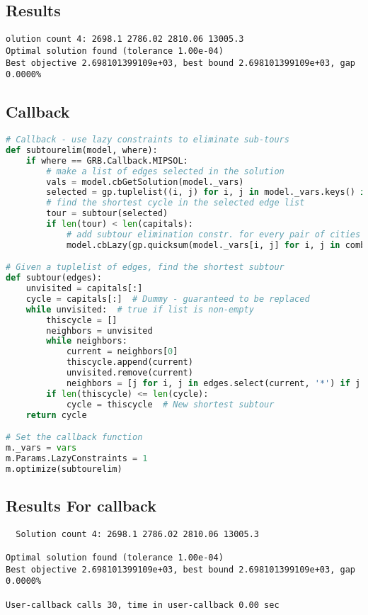 \subsection*{Results}
\begin{verbatim}
olution count 4: 2698.1 2786.02 2810.06 13005.3 
Optimal solution found (tolerance 1.00e-04)
Best objective 2.698101399109e+03, best bound 2.698101399109e+03, gap 0.0000%
\end{verbatim}
\subsection*{Callback}
\begin{center}
    \begin{lstlisting}[language=Python, caption={Using Callback Function}]
        # Callback - use lazy constraints to eliminate sub-tours
def subtourelim(model, where):
    if where == GRB.Callback.MIPSOL:
        # make a list of edges selected in the solution
        vals = model.cbGetSolution(model._vars)
        selected = gp.tuplelist((i, j) for i, j in model._vars.keys() if vals[i, j] > 0.5)
        # find the shortest cycle in the selected edge list
        tour = subtour(selected)
        if len(tour) < len(capitals):
            # add subtour elimination constr. for every pair of cities in subtour
            model.cbLazy(gp.quicksum(model._vars[i, j] for i, j in combinations(tour, 2)) <= len(tour) - 1)

# Given a tuplelist of edges, find the shortest subtour
def subtour(edges):
    unvisited = capitals[:]
    cycle = capitals[:]  # Dummy - guaranteed to be replaced
    while unvisited:  # true if list is non-empty
        thiscycle = []
        neighbors = unvisited
        while neighbors:
            current = neighbors[0]
            thiscycle.append(current)
            unvisited.remove(current)
            neighbors = [j for i, j in edges.select(current, '*') if j in unvisited]
        if len(thiscycle) <= len(cycle):
            cycle = thiscycle  # New shortest subtour
    return cycle

# Set the callback function
m._vars = vars
m.Params.LazyConstraints = 1
m.optimize(subtourelim)

    \end{lstlisting}
\end{center}
\newpage
\subsection*{Results For callback}
\begin{verbatim}
  Solution count 4: 2698.1 2786.02 2810.06 13005.3 

Optimal solution found (tolerance 1.00e-04)
Best objective 2.698101399109e+03, best bound 2.698101399109e+03, gap 0.0000%

User-callback calls 30, time in user-callback 0.00 sec  
\end{verbatim}


